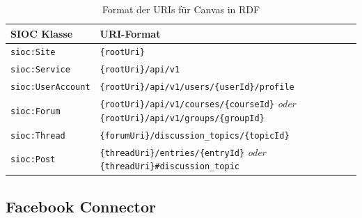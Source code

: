\begin{table}[ht]
    \centering
    \caption{Format der URIs für Canvas in RDF}
    \begin{tabular}{l|p{13cm}}
        \textbf{SIOC Klasse} & \textbf{URI-Format}\\ 
        \hline
        \texttt{sioc:Site} & 
        \texttt{\{rootUri\}} \\

        \texttt{sioc:Service} & 
        \texttt{\{rootUri\}/api/v1} \\

        \texttt{sioc:UserAccount} & 
        \texttt{\{rootUri\}/api/v1/users/\{userId\}/profile} \\

        \texttt{sioc:Forum} & 
        \texttt{\{rootUri\}/api/v1/courses/\{courseId\}} \emph{oder} \newline  \texttt{\{rootUri\}/api/v1/groups/\{groupId\}} \\

        \texttt{sioc:Thread} & 
        \texttt{\{forumUri\}/discussion\_topics/\{topicId\}} \\

        \texttt{sioc:Post} & 
        \texttt{\{threadUri\}/entries/\{entryId\}} \emph{oder} \newline \texttt{\{threadUri\}\#discussion\_topic} \\
    \end{tabular}
    \label{tbl:canvas_uri_platzhalter}
\end{table}



\subsection{Facebook Connector} %
\label{sub:facebook_connector}


